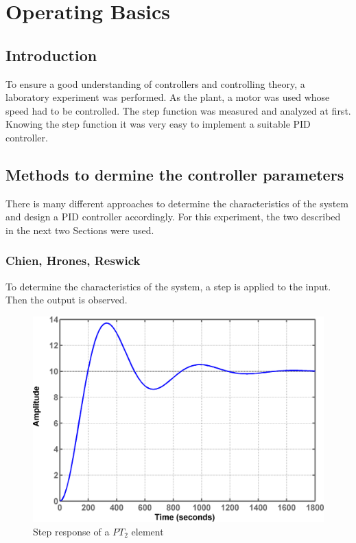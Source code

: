 \section{Operating Basics}

\subsection{Introduction}

To ensure a good understanding of controllers and controlling theory, a laboratory experiment was performed. As the plant, a motor was used whose speed had to be controlled.
The step function was measured and analyzed at first. Knowing the step function it was very easy to implement a suitable PID controller.

\subsection{Methods to dermine the controller parameters}

There is many different approaches to determine the characteristics of the system and design a PID controller accordingly. For this experiment, the two described in the next two Sections were used.

\subsubsection{Chien, Hrones, Reswick}
\label{subs:Chien, Hrones, Reswick}

To determine the characteristics of the system, a step is applied to the input. Then the output is observed.

\begin{figure}[H]
\begin{center}
\includegraphics[width=0.6\linewidth]{images/general/step_pt2}
\end{center}
\caption{Step response of a $PT_2$ element}
\label{fig:step_pt2}
\end{figure}

